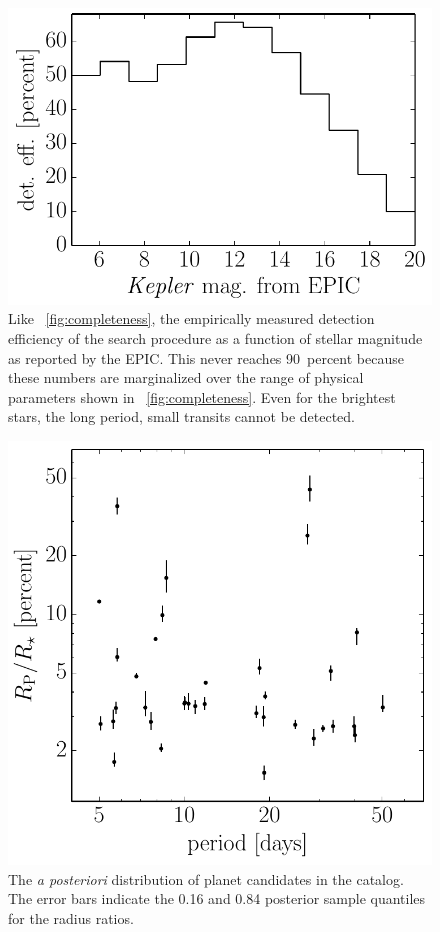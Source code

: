 \documentclass[12pt,preprint]{aastex}
\newcommand{\figref}[1]{\ref{fig:#1}}
\newcommand{\Fig}[1]{\figurename~\figref{#1}}
\newcommand{\fig}[1]{\Fig{#1}}
\newcommand{\figlabel}[1]{\label{fig:#1}}
\begin{document}
\begin{figure}[p]
\begin{center}
\includegraphics{figures/completeness-mag.pdf}
\end{center}
\caption{%
Like \fig{completeness}, the empirically measured detection efficiency of the
search procedure as a function of stellar magnitude as reported by the EPIC.
This never reaches 90~percent because these numbers are marginalized over the
range of physical parameters shown in \fig{completeness}.
Even for the brightest stars, the long period, small transits cannot be
detected.
\figlabel{completeness-mag}}
\end{figure}

\begin{figure}[p]
\begin{center}
\includegraphics{figures/candidates.pdf}
\end{center}
\caption{%
The \emph{a posteriori} distribution of planet candidates in the catalog.
The error bars indicate the 0.16 and 0.84 posterior sample quantiles for the
radius ratios.
\figlabel{candidates}}
\end{figure}
\end{document}
